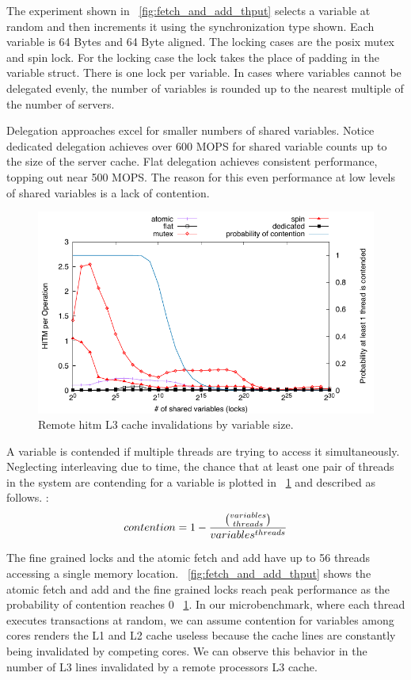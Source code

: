 \documentclass{uicthesi}
\begin{document}
The experiment shown in ~\ref{fig:fetch_and_add_thput} selects a variable at random and then increments it using the synchronization type shown. Each variable is 64 Bytes and 64 Byte aligned. The locking cases are the posix mutex and spin lock. For the locking case the lock takes the place of padding in the variable struct. There is one lock per variable. In cases where variables cannot be delegated evenly, the number of variables is rounded up to the nearest multiple of the number of servers. 

Delegation approaches excel for smaller numbers of shared variables. Notice dedicated delegation achieves over 600 MOPS for shared variable counts up to the size of the server cache. Flat delegation achieves consistent performance, topping out near 500 MOPS. The reason for this even performance at low levels of shared variables is a lack of contention.

\begin{figure}[ht!]
\centering
\includegraphics[width=0.9\columnwidth]{FIG/hitm_per_op.pdf}
\caption{Remote hitm L3 cache invalidations by variable size. }
\label{fig:contention}
\end{figure}

A variable is contended if multiple threads are trying to access it simultaneously. Neglecting interleaving due to time, the chance that at least one pair of threads in the system are contending for a variable is plotted in ~\ref{fig:contention} and described as follows. : 
\begin{displaymath}
contention = 1 - {{ variables \choose threads }  \over  variables^{threads}}
\end{displaymath}


The fine grained locks and the atomic fetch and add have up to 56 threads accessing a single memory location. ~\ref{fig:fetch_and_add_thput} shows the atomic fetch and add and the fine grained locks reach peak performance as the probability of contention reaches 0 ~\ref{fig:contention}. In our microbenchmark, where each thread executes transactions at random, we can assume contention for variables among cores renders the L1 and L2 cache useless because the cache lines are constantly being invalidated by competing cores. We can observe this behavior in the number of L3 lines invalidated by a remote processors L3 cache. 
\end{document}
